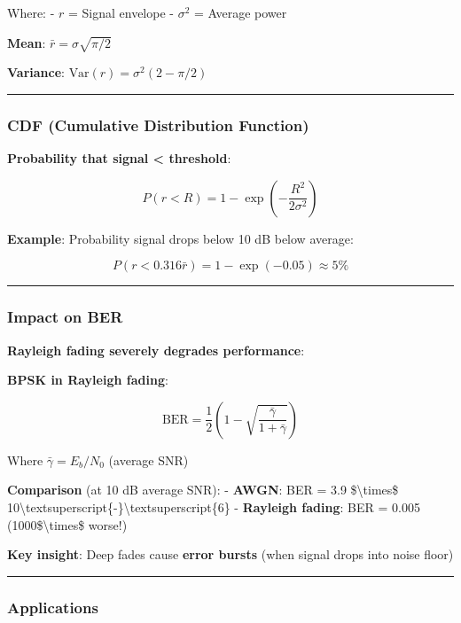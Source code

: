 Where: - \(r\) = Signal envelope - \(\sigma^2\) = Average power

\textbf{Mean}: \(\bar{r} = \sigma\sqrt{\pi/2}\)

\textbf{Variance}: \(\text{Var}(r) = \sigma^2(2 - \pi/2)\)

\begin{center}\rule{0.5\linewidth}{0.5pt}\end{center}

\subsubsection{CDF (Cumulative Distribution
Function)}\label{cdf-cumulative-distribution-function}

\textbf{Probability that signal \textless{} threshold}:

\[
P(r < R) = 1 - \exp\left(-\frac{R^2}{2\sigma^2}\right)
\]

\textbf{Example}: Probability signal drops below 10 dB below average:

\[
P(r < 0.316\bar{r}) = 1 - \exp(-0.05) \approx 5\%
\]

\begin{center}\rule{0.5\linewidth}{0.5pt}\end{center}

\subsubsection{Impact on BER}\label{impact-on-ber}

\textbf{Rayleigh fading severely degrades performance}:

\textbf{BPSK in Rayleigh fading}:

\[
\text{BER} = \frac{1}{2}\left(1 - \sqrt{\frac{\bar{\gamma}}{1 + \bar{\gamma}}}\right)
\]

Where \(\bar{\gamma} = E_b/N_0\) (average SNR)

\textbf{Comparison} (at 10 dB average SNR): - \textbf{AWGN}: BER = 3.9
\$\textbackslash times\$
10\textbackslash textsuperscript\{-\}\textbackslash textsuperscript\{6\}
- \textbf{Rayleigh fading}: BER = 0.005 (1000\$\textbackslash times\$
worse!)

\textbf{Key insight}: Deep fades cause \textbf{error bursts} (when
signal drops into noise floor)

\begin{center}\rule{0.5\linewidth}{0.5pt}\end{center}

\subsubsection{Applications}\label{applications}

